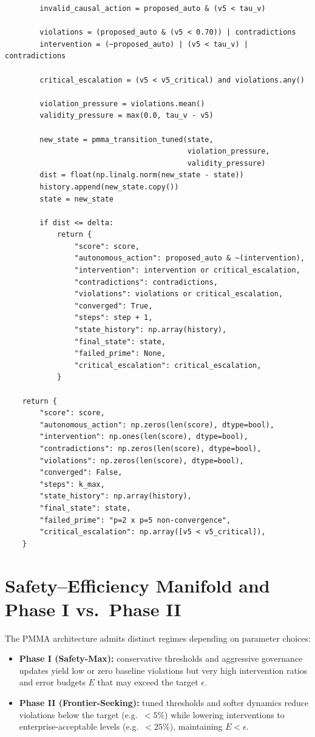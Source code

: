 \documentclass[11pt]{article}
\begin{document}
\begin{verbatim}
        invalid_causal_action = proposed_auto & (v5 < tau_v)

        violations = (proposed_auto & (v5 < 0.70)) | contradictions
        intervention = (~proposed_auto) | (v5 < tau_v) | contradictions

        critical_escalation = (v5 < v5_critical) and violations.any()

        violation_pressure = violations.mean()
        validity_pressure = max(0.0, tau_v - v5)

        new_state = pmma_transition_tuned(state,
                                          violation_pressure,
                                          validity_pressure)
        dist = float(np.linalg.norm(new_state - state))
        history.append(new_state.copy())
        state = new_state

        if dist <= delta:
            return {
                "score": score,
                "autonomous_action": proposed_auto & ~(intervention),
                "intervention": intervention or critical_escalation,
                "contradictions": contradictions,
                "violations": violations or critical_escalation,
                "converged": True,
                "steps": step + 1,
                "state_history": np.array(history),
                "final_state": state,
                "failed_prime": None,
                "critical_escalation": critical_escalation,
            }

    return {
        "score": score,
        "autonomous_action": np.zeros(len(score), dtype=bool),
        "intervention": np.ones(len(score), dtype=bool),
        "contradictions": np.zeros(len(score), dtype=bool),
        "violations": np.zeros(len(score), dtype=bool),
        "converged": False,
        "steps": k_max,
        "state_history": np.array(history),
        "final_state": state,
        "failed_prime": "p=2 x p=5 non-convergence",
        "critical_escalation": np.array([v5 < v5_critical]),
    }
\end{verbatim}

\section{Safety--Efficiency Manifold and Phase I vs.\ Phase II}

The PMMA architecture admits distinct regimes depending on parameter choices:
\begin{itemize}
  \item \textbf{Phase I (Safety-Max):} conservative thresholds and aggressive governance updates yield low or zero baseline violations but very high intervention ratios and error budgets $E$ that may exceed the target $\epsilon$.
  \item \textbf{Phase II (Frontier-Seeking):} tuned thresholds and softer dynamics reduce violations below the target (e.g.\ $<5\%$) while lowering interventions to enterprise-acceptable levels (e.g.\ $<25\%$), maintaining $E < \epsilon$.
\end{itemize}
\end{document}
